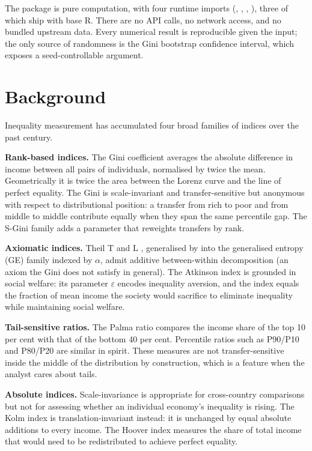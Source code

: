 The package is pure computation, with four runtime imports
(, , , ),
three of which ship with base R. There are no API calls, no network
access, and no bundled upstream data. Every numerical result is
reproducible given the input; the only source of randomness is the
Gini bootstrap confidence interval, which exposes a seed-controllable
argument.

\section{Background}\label{background}

Inequality measurement has accumulated four broad families of indices
over the past century.

\textbf{Rank-based indices.} The Gini coefficient \citep{gini1912variabilita}
averages the absolute difference in income between all pairs of
individuals, normalised by twice the mean. Geometrically it is twice
the area between the Lorenz curve \citep{lorenz1905methods} and the line of
perfect equality. The Gini is scale-invariant and transfer-sensitive
but anonymous with respect to distributional position: a transfer from
rich to poor and from middle to middle contribute equally when they
span the same percentile gap. The S-Gini family
\citep{donaldson1980single} adds a parameter that reweights transfers by
rank.

\textbf{Axiomatic indices.} Theil T and L \citep{theil1967information},
generalised by \citet{shorrocks1980class} into the generalised entropy (GE)
family indexed by \(\alpha\), admit additive between-within
decomposition (an axiom the Gini does not satisfy in general). The
Atkinson index \citep{atkinson1970measurement} is grounded in social
welfare: its parameter \(\varepsilon\) encodes inequality aversion, and
the index equals the fraction of mean income the society would
sacrifice to eliminate inequality while maintaining social welfare.

\textbf{Tail-sensitive ratios.} The Palma ratio \citep{palma2011homogeneous}
compares the income share of the top 10 per cent with that of the
bottom 40 per cent. Percentile ratios such as P90/P10 and P80/P20 are
similar in spirit. These measures are not transfer-sensitive inside
the middle of the distribution by construction, which is a feature
when the analyst cares about tails.

\textbf{Absolute indices.} Scale-invariance is appropriate for
cross-country comparisons but not for assessing whether an individual
economy's inequality is rising. The Kolm index
\citep{kolm1976unequal} is translation-invariant instead: it is unchanged
by equal absolute additions to every income. The Hoover index
measures the share of total income that would need to be redistributed
to achieve perfect equality.

